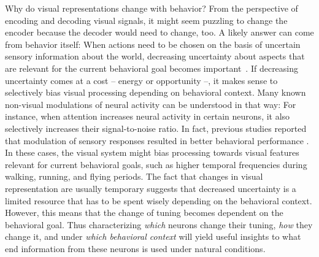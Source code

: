 \documentclass[B2,COG]{ercgrant}
\begin{document}
Why do visual representations change with behavior? From the perspective of encoding and decoding visual signals, it might seem puzzling to change the encoder because the decoder would need to change, too. 
A likely answer can come from behavior itself:
When actions need to be chosen on the basis of uncertain sensory information about the world, decreasing uncertainty about aspects that are relevant for the current behavioral goal becomes important~\parencite{Chebolu2022-tb}. 
If decreasing uncertainty comes at a cost -- energy or opportunity --, it makes sense to selectively bias visual processing depending on behavioral context.
Many known non-visual modulations of neural activity can be understood in that way: 
For instance, when attention increases neural activity in certain neurons, it also selectively increases their signal-to-noise ratio. 
In fact, previous studies reported that modulation of sensory responses resulted in better behavioral performance \parencite{Spitzer1988-kq, Bennett2013-rk, Dadarlat2017-jw, De_Gee2022-ir}.
In these cases, the visual system might bias processing towards visual features relevant for current behavioral goals, such as higher temporal frequencies during walking, running, and flying periods.
The fact that changes in visual representation are usually temporary suggests that decreased uncertainty is a limited resource that has to be spent wisely depending on the behavioral context.
However, this means that the change of tuning becomes dependent on the behavioral goal.
Thus characterizing \textit{which} neurons change their tuning, \textit{how} they change it, and under \textit{which behavioral context} will yield useful insights to what end information from these neurons is used under natural conditions.
\end{document}
